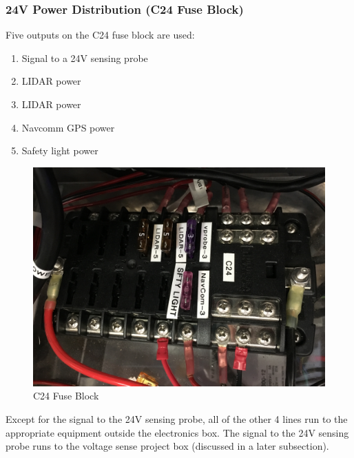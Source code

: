 \subsubsection{24V Power Distribution (C24 Fuse Block)}

\begin{minipage}{0.6\textwidth}
Five outputs on the C24 fuse block are used:\\
\begin{enumerate}
\item Signal to a 24V sensing probe
\item LIDAR power
\item LIDAR power
\item Navcomm GPS power
\item Safety light power
\end{enumerate}
\end{minipage} \hfill
\begin{minipage}{0.5\textwidth}
\begin{figure}[H]
\centering
\includegraphics[scale=.05, angle=-90]{Photos/C24.jpg}
\caption{\label{fig:C24} C24 Fuse Block}
\end{figure}
\end{minipage}

\bigskip

\noindent  Except for the signal to the 24V sensing probe, all of the other 4 lines run to the appropriate equipment outside the electronics box. The signal to the 24V sensing probe runs to the voltage sense project box (discussed in a later subsection).

\newpage

